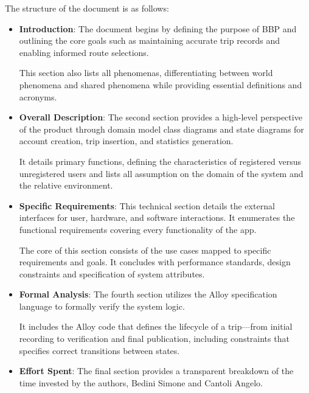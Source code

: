 The structure of the document is as follows:
\begin{itemize}
    \item \textbf{Introduction}: The document begins by defining the purpose of BBP and outlining the core goals such as maintaining accurate trip records and enabling informed route selections. 
    
    This section also lists all phenomenas, differentiating between world phenomena and shared phenomena while providing essential definitions and acronyms.
    \item \textbf{Overall Description}: The second section provides a high-level perspective of the product through domain model class diagrams and state diagrams for account creation, trip insertion, and statistics generation. 
    
    It details primary functions, defining the characteristics of registered versus unregistered users and lists all assumption on the domain of the system and the relative environment.
    \item \textbf{Specific Requirements}: This technical section details the external interfaces for user, hardware, and software interactions. It enumerates the functional requirements covering every functionality of the app. 
    
    The core of this section consists of the use cases mapped to specific requirements and goals. It concludes with performance standards, design constraints and specification of system attributes.
    \item \textbf{Formal Analysis}: The fourth section utilizes the Alloy specification language to formally verify the system logic. 
    
    It includes the Alloy code that defines the lifecycle of a trip—from initial recording to verification and final publication, including constraints that specifies correct transitions between states. 
    \item \textbf{Effort Spent}: The final section provides a transparent breakdown of the time invested by the authors, Bedini Simone and Cantoli Angelo.
\end{itemize}